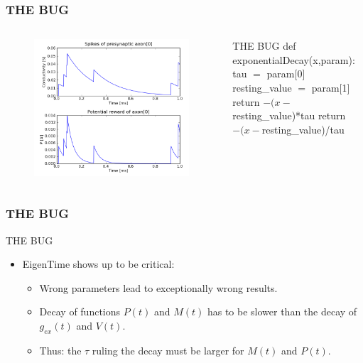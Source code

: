 \documentclass{beamer}
\begin{document}
	\begin{frame} 
		\frametitle{THE \alert{BUG}} 
		\begin{columns} 
				\begin{figure} 
					\centering
					\includegraphics[width=\textwidth]{graphics/demo/fig01} 
				\end{figure} 
				\begin{block}{THE \alert{BUG}}
					\vspace{5 mm}
					def exponentialDecay(x,param):
					\hspace*{4mm}tau $=$ param[0]\\
					\hspace*{4mm}resting\_value $=$ param[1]
					\hspace*{4mm}\alert{return $-(x-$resting\_value)*tau}
					\hspace*{4mm}return $-(x-$resting\_value)/tau
				\end{block}
		\end{columns}
	\end{frame}
	
	\begin{frame} 
		\frametitle{THE \alert{BUG}} 
		\begin{block}{THE \alert{BUG}}
			\begin{itemize} 
				\item \alert{EigenTime} shows up to be \alert{critical}: 
				\begin{itemize} 
					\item Wrong parameters lead to exceptionally wrong results. 
					\item Decay of functions $P(t)$ and $M(t)$ \alert{has to be slower} than the decay of $g_{ex}(t)$ and $V(t)$. 
					\item Thus: the \alert{$\tau$} ruling the decay \alert{must be larger} for $M(t)$ and $P(t)$. 
				\end{itemize}
			\end{itemize}
		\end{block}
	\end{frame}
	
\end{document}

